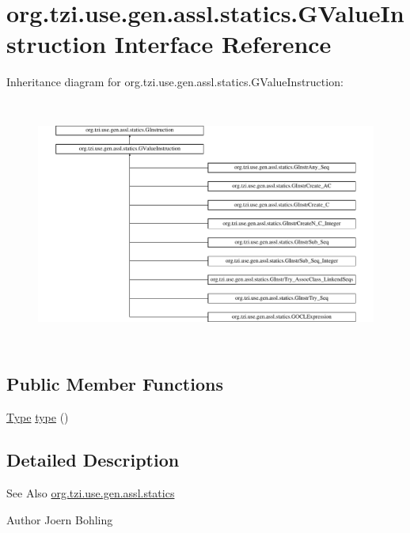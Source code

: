 \hypertarget{interfaceorg_1_1tzi_1_1use_1_1gen_1_1assl_1_1statics_1_1_g_value_instruction}{\section{org.\-tzi.\-use.\-gen.\-assl.\-statics.\-G\-Value\-Instruction Interface Reference}
\label{interfaceorg_1_1tzi_1_1use_1_1gen_1_1assl_1_1statics_1_1_g_value_instruction}
}
Inheritance diagram for org.\-tzi.\-use.\-gen.\-assl.\-statics.\-G\-Value\-Instruction\-:\begin{figure}[H]
\begin{center}
\leavevmode
\includegraphics[height=8.191490cm]{interfaceorg_1_1tzi_1_1use_1_1gen_1_1assl_1_1statics_1_1_g_value_instruction}
\end{center}
\end{figure}
\subsection*{Public Member Functions}
\begin{DoxyCompactItemize}
\item 
\hyperlink{interfaceorg_1_1tzi_1_1use_1_1uml_1_1ocl_1_1type_1_1_type}{Type} \hyperlink{interfaceorg_1_1tzi_1_1use_1_1gen_1_1assl_1_1statics_1_1_g_value_instruction_a8fb7e593c2822d29ca840961f1f19df3}{type} ()
\end{DoxyCompactItemize}


\subsection{Detailed Description}
\begin{DoxySeeAlso}{See Also}
\hyperlink{namespaceorg_1_1tzi_1_1use_1_1gen_1_1assl_1_1statics}{org.\-tzi.\-use.\-gen.\-assl.\-statics} 
\end{DoxySeeAlso}
\begin{DoxyAuthor}{Author}
Joern Bohling 
\end{DoxyAuthor}


